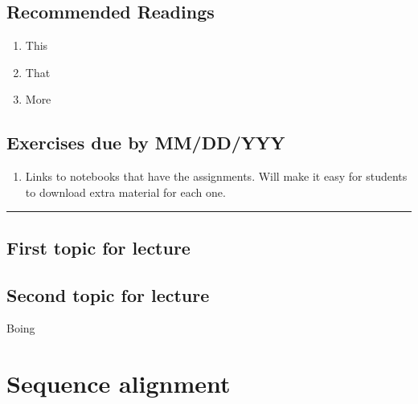\documentclass[]{book}
\providecommand{\tightlist}{%
  \setlength{\itemsep}{0pt}\setlength{\parskip}{0pt}}
\begin{document}
\hypertarget{recommended-readings-4}{%
\section*{Recommended Readings}\label{recommended-readings-4}}

\begin{enumerate}
\def\labelenumi{\arabic{enumi}.}
\tightlist
\item
  This
\item
  That
\item
  More
\end{enumerate}

\hypertarget{exercises-due-by-mmddyyy-4}{%
\section*{Exercises due by MM/DD/YYY}\label{exercises-due-by-mmddyyy-4}}

\begin{enumerate}
\def\labelenumi{\arabic{enumi}.}
\tightlist
\item
  Links to notebooks that have the assignments. Will make it
  easy for students to download extra material for each one.
\end{enumerate}

\begin{center}\rule{0.5\linewidth}{\linethickness}\end{center}

\hypertarget{first-topic-for-lecture-3}{%
\section{First topic for lecture}\label{first-topic-for-lecture-3}}

\hypertarget{second-topic-for-lecture-3}{%
\section{Second topic for lecture}\label{second-topic-for-lecture-3}}

Boing

\hypertarget{sequence-alignment}{%
\chapter{Sequence alignment}\label{sequence-alignment}}
\end{document}

